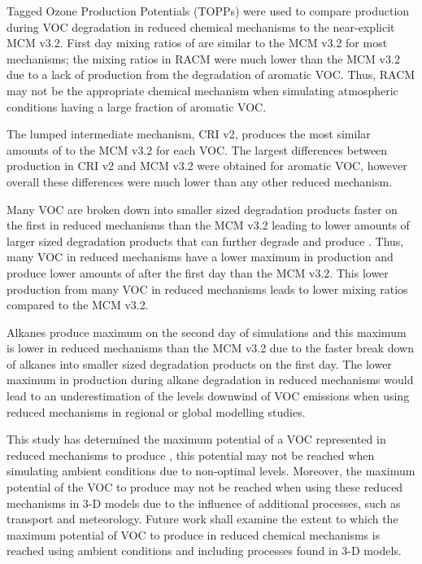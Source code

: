 Tagged Ozone Production Potentials (TOPPs) were used to compare  production during VOC degradation in reduced chemical mechanisms to the near-explicit MCM v3.2. 
First day mixing ratios of  are similar to the MCM v3.2 for most mechanisms; the  mixing ratios in RACM were much lower than the MCM v3.2 due to a lack of  production from the degradation of aromatic VOC.
Thus, RACM may not be the appropriate chemical mechanism when simulating atmospheric conditions having a large fraction of aromatic VOC.

The lumped intermediate mechanism, CRI v2, produces the most similar amounts of  to the MCM v3.2 for each VOC.
The largest differences between  production in CRI v2 and MCM v3.2 were obtained for aromatic VOC, however overall these differences were much lower than any other reduced mechanism.

Many VOC are broken down into smaller sized degradation products faster on the first in reduced mechanisms than the MCM v3.2 leading to lower amounts of larger sized degradation products that can further degrade and produce .
Thus, many VOC in reduced mechanisms have a lower maximum in  production and produce lower amounts of  after the first day than the MCM v3.2.
This lower  production from many VOC in reduced mechanisms leads to lower  mixing ratios compared to the MCM v3.2.

Alkanes produce maximum  on the second day of simulations and this maximum is lower in reduced mechanisms than the MCM v3.2 due to the faster break down of alkanes into smaller sized degradation products on the first day.
The lower maximum in  production during alkane degradation in reduced mechanisms would lead to an underestimation of the  levels downwind of VOC emissions when using reduced mechanisms in regional or global modelling studies.

This study has determined the maximum potential of a VOC represented in reduced mechanisms to produce , this potential may not be reached when simulating ambient conditions due to non-optimal  levels.
Moreover, the maximum potential of the VOC to produce  may not be reached when using these reduced mechanisms in 3-D models due to the influence of additional processes, such as transport and meteorology.
Future work shall examine the extent to which the maximum potential of VOC to produce  in reduced chemical mechanisms is reached using ambient  conditions and including processes found in 3-D models.
